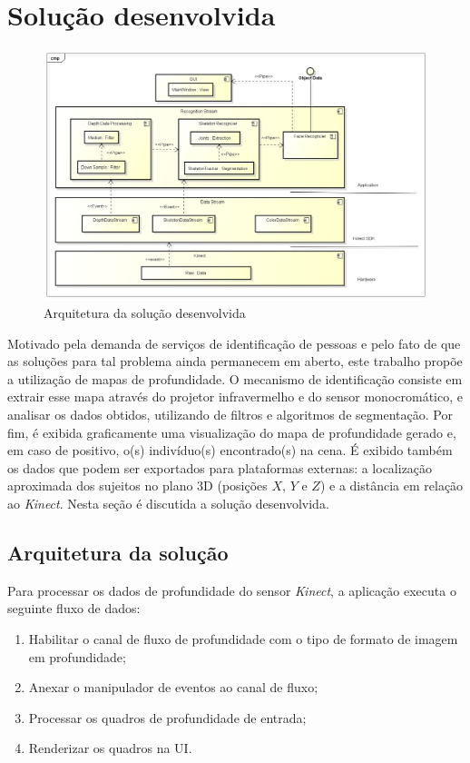 \section{Solução desenvolvida}\label{sec:solucao-desenvolvida}

\begin{figure}[ht]
\centering
\includegraphics[width=1.0\textwidth]{images/Arquitetura_da_solucao.png}
\caption{Arquitetura da solução desenvolvida}
\label{fig:visao-geral}
\end{figure}

Motivado pela demanda de serviços de identificação de pessoas e pelo fato de que as soluções para tal problema ainda permanecem em aberto, este trabalho propõe a utilização de mapas de profundidade. O mecanismo de identificação consiste em extrair esse mapa através do projetor infravermelho e do sensor monocromático, e analisar os dados obtidos, utilizando de filtros e algoritmos de segmentação. Por fim, é exibida graficamente uma visualização do mapa de profundidade gerado e, em caso de positivo, o(s) indivíduo(s) encontrado(s) na cena. É exibido também os dados que podem ser exportados para plataformas externas: a localização aproximada dos sujeitos no plano 3D (posições $X$, $Y$ e $Z$) e a distância em relação ao \textit{Kinect}. Nesta seção é discutida a solução desenvolvida.

\subsection{Arquitetura da solução}\label{sec:arqSol}
Para processar os dados de profundidade do sensor \textit{Kinect}, a aplicação executa o seguinte fluxo de dados:

\begin{enumerate}
    \item Habilitar o canal de fluxo de profundidade com o tipo de formato de imagem em profundidade; 
    \item Anexar o manipulador de eventos ao canal de fluxo; 
    \item Processar os quadros de profundidade de entrada; 
    \item Renderizar os quadros na UI.
\end{enumerate}

